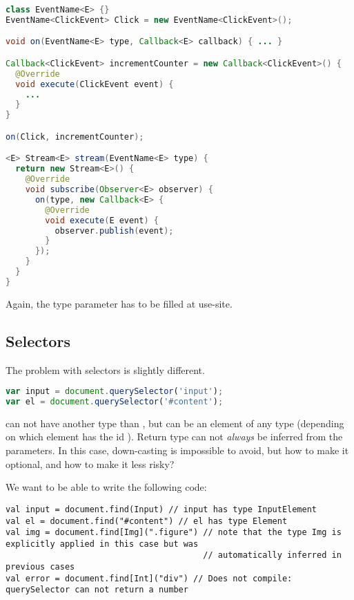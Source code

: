 \documentclass[runningheads,a4paper]{llncs}
\begin{document}
\begin{lstlisting}[language=Java]
class EventName<E> {}
EventName<ClickEvent> Click = new EventName<ClickEvent>();

void on(EventName<E> type, Callback<E> callback) { ... }

Callback<ClickEvent> incrementCounter = new Callback<ClickEvent>() {
  @Override
  void execute(ClickEvent event) {
    ...
  }
}

on(Click, incrementCounter);

<E> Stream<E> stream(EventName<E> type) {
  return new Stream<E>() {
    @Override
    void subscribe(Observer<E> observer) {
      on(type, new Callback<E> {
        @Override
        void execute(E event) {
          observer.publish(event);
        }
      });
    }
  }
}

\end{lstlisting}

Again, the type parameter  has to be filled at use-site.

\subsection{Selectors}

The problem with selectors is slightly different.

\begin{lstlisting}[language=JavaScript]
var input = document.querySelector('input');
var el = document.querySelector('#content');
\end{lstlisting}

 can not have another type than , but  can be an element of any type (depending
on which element has the id ). Return type can not \emph{always} be inferred from the parameters.
In this case, down-casting is impossible to avoid, but how to make it optional, and how to make it less risky?

We want to be able to write the following code:

\begin{lstlisting}
val input = document.find(Input) // input has type InputElement
val el = document.find("#content") // el has type Element
val img = document.find[Img](".figure") // note that the type Img is explicitly applied in this case but was
                                        // automatically inferred in previous cases
val error = document.find[Int]("div") // Does not compile: querySelector can not return a number
\end{lstlisting}
\end{document}
